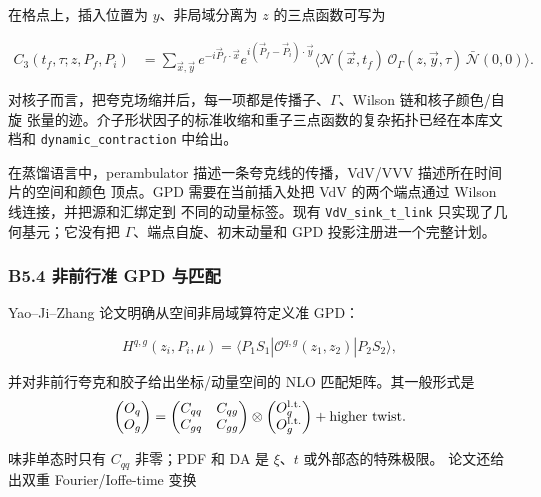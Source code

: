 \documentclass[UTF8]{ctexart}
\begin{document}
在格点上，插入位置为 $y$、非局域分离为 $z$ 的三点函数可写为

\begin{equation}
\begin{aligned}
C_3(t_f,\tau;z,P_f,P_i)
&=\sum_{\vec x,\vec y}
e^{-i\vec P_f\cdot\vec x}
e^{i(\vec P_f-\vec P_i)\cdot\vec y}
\Big\langle
\mathcal N(\vec x,t_f)\,
\mathcal O_\Gamma(z,\vec y,\tau)\,
\bar{\mathcal N}(0,0)
\Big\rangle .
\end{aligned}
\label{eq:lattice-3pt}
\end{equation}

对核子而言，把夸克场缩并后，每一项都是传播子、$\Gamma$、Wilson 链和核子颜色/自旋
张量的迹。介子形状因子的标准收缩和重子三点函数的复杂拓扑已经在本库文档和
\texttt{dynamic\_contraction} 中给出。 \cite{D10,C3,C4,C5}

在蒸馏语言中，perambulator 描述一条夸克线的传播，VdV/VVV 描述所在时间片的空间和颜色
顶点。GPD 需要在当前插入处把 VdV 的两个端点通过 Wilson 线连接，并把源和汇绑定到
不同的动量标签。现有 \texttt{VdV\_sink\_t\_link} 只实现了几何基元；它没有把
$\Gamma$、端点自旋、初末动量和 GPD 投影注册进一个完整计划。 \cite{C2}

\subsubsection{B5.4 非前行准 GPD 与匹配}

Yao--Ji--Zhang 论文明确从空间非局域算符定义准 GPD：

\begin{equation}
H^{q,g}(z_i,P_i,\mu)
=\langle P_1S_1|\mathcal O^{q,g}(z_1,z_2)|P_2S_2\rangle,
\label{eq:quasigpd}
\end{equation}

并对非前行夸克和胶子给出坐标/动量空间的 NLO 匹配矩阵。其一般形式是
\begin{equation}
\begin{pmatrix}O_q\\O_g\end{pmatrix}
=
\begin{pmatrix}
C_{qq}&C_{qg}\\
C_{gq}&C_{gg}
\end{pmatrix}
\otimes
\begin{pmatrix}O_q^{\rm l.t.}\\O_g^{\rm l.t.}\end{pmatrix}
+\text{higher twist}.
\label{eq:matching-matrix}
\end{equation}

味非单态时只有 $C_{qq}$ 非零；PDF 和 DA 是 $\xi$、$t$ 或外部态的特殊极限。
论文还给出双重 Fourier/Ioffe-time 变换
\end{document}
